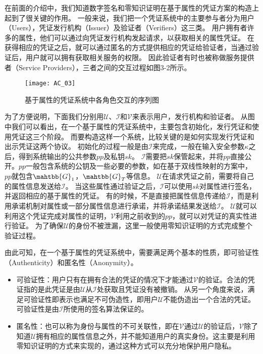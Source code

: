 在前面的介绍中，我们知道数字签名和零知识证明在基于属性的凭证方案的构造上起到了很关键的作用。
一般来说，我们把一个凭证系统中的主要参与者分为用户（Users），凭证发行机构（Issuer）及验证者（Verifiers）这三类。
用户拥有者许多的属性，他们可以通过向凭证发行机构发起请求，以获取相关的属性凭证。
在获得相应的凭证之后，就可以通过匿名的方式提供相应的凭证给验证者，当通过验证后，用户就可以拥有获取相关服务的权限。
因此验证者有时也被称做服务提供者（Service Providers），三者之间的交互过程如图3-2所示。

\begin{figure}[h]
\centering
\texttt{[image: AC\_03]}
\caption{基于属性的凭证系统中各角色交互的序列图}
\end{figure}

为了方便说明，下面我们分别用$\mathcal{U}$、$\mathcal{I}$和$\mathcal{V}$来表示用户，发行机构和验证者。
从图中我们可以看出，在一个基于属性的凭证系统中，主要包含初始化，发行凭证和使用凭证这三个阶段。
而要构造这样一个系统，比较关键的是如何实现发行凭证和出示凭证这两个协议。
初始化的过程一般是由$\mathcal{I}$来完成，一般在输入安全参数$\kappa$之后，得到系统输出的公共参数$pp$及私钥$sk$。
$\mathcal{I}$需要把$sk$保管起来，并将$pp$直接公开。$pp$一般包含系统的公钥及一些必要的参数，如在基于双线性映射的方案中，$pp$就包含$\mahtbb{G}_1$，$\mahtbb{G}_T$等信息。
$\mathcal{U}$在请求凭证之前，需要将自己的属性信息发送给$\mathcal{I}$。
当这些属性通过验证之后，$\mathcal{I}$可以使用$sk$对属性进行签名，并返回相应的基于属性的凭证。
有的时候，不是直接把属性信息传递给$\mathcal{I}$，而是利用承诺机制对属性或一部分属性信息进行承诺，并将承诺结果发送给$\mathcal{I}$。
$\mathcal{U}$就可以利用这个凭证完成对属性的证明，$\mathcal{V}$利用之前收到的$pp$，就可以对凭证的真实性进行验证。
为了确保$\mathcal{U}$的身份不被泄漏，这里一般使用零知识证明的方式完成整个验证过程。

由此可知，在一个基于属性的凭证系统中，需要满足两个基本的性质，即可验证性（Authenticity）和匿名性（Anonymity）。

\begin{itemize}
  \item 可验证性：用户只有在拥有合法的凭证的情况下才能通过$\mathcal{V}$的验证。合法的凭证指的是此凭证是由$\mathcal{U}$从$\mathcal{I}$处获取且凭证没有被撤销。
  从另一个角度来说，满足可验证性即表示也满足不可伪造性，即用户$\mathcal{U}$不能伪造出一个合法的凭证。可验证性是由$\mathcal{I}$所使用的签名算法保证的。
  \item 匿名性：也可以称为身份与属性的不可关联性，即在$\mathcal{V}$通过$\mathcal{U}$的验证后，$\mathcal{V}$除了知道$\mathcal{U}$拥有相应的属性信息之外，并不能知道用户的真实身份。这主要是利用零知识证明的方式来实现的，通过这种方式可以充分地保护用户隐私。
\end{itemize}

